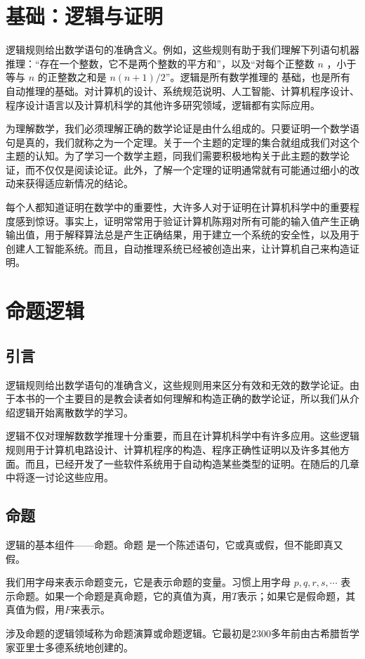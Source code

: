 \section{基础：逻辑与证明}
逻辑规则给出数学语句的准确含义。例如，这些规则有助于我们理解下列语句机器推理：“存在一个整数，它不是两个整数的平方和”，以及“对每个正整数 $n$ ，小于等与 $n$ 的正整数之和是 $n(n+1)/2$”。逻辑是所有数学推理的 基础，也是所有自动推理的基础。对计算机的设计、系统规范说明、人工智能、计算机程序设计、程序设计语言以及计算机科学的其他许多研究领域，逻辑都有实际应用。

为理解数学，我们必须理解正确的数学论证是由什么组成的。只要证明一个数学语句是真的，我们就称之为一个定理。关于一个主题的定理的集合就组成我们对这个主题的认知。为了学习一个数学主题，同我们需要积极地构关于此主题的数学论证，而不仅仅是阅读论证。此外，了解一个定理的证明通常就有可能通过细小的改动来获得适应新情况的结论。

每个人都知道证明在数学中的重要性，大许多人对于证明在计算机科学中的重要程度感到惊讶。事实上，证明常常用于验证计算机陈翔对所有可能的输入值产生正确输出值，用于解释算法总是产生正确结果，用于建立一个系统的安全性，以及用于创建人工智能系统。而且，自动推理系统已经被创造出来，让计算机自己来构造证明。
\section{命题逻辑}
\subsection{引言}
逻辑规则给出数学语句的准确含义，这些规则用来区分有效和无效的数学论证。由于本书的一个主要目的是教会读者如何理解和构造正确的数学论证，所以我们从介绍逻辑开始离散数学的学习。  

逻辑不仅对理解数数学推理十分重要，而且在计算机科学中有许多应用。这些逻辑规则用于计算机电路设计、计算机程序的构造、程序正确性证明以及许多其他方面。而且，已经开发了一些软件系统用于自动构造某些类型的证明。在随后的几章中将逐一讨论这些应用。

\subsection{命题}
逻辑的基本组件——命题。命题 是一个陈述语句，它或真或假，但不能即真又假。  

我们用字母来表示命题变元，它是表示命题的变量。习惯上用字母 
$p,q,r,s,\cdots$ 
表示命题。如果一个命题是真命题，它的真值为真，用$T$表示；如果它是假命题，其真值为假，用$F$来表示。  

涉及命题的逻辑领域称为命题演算或命题逻辑。它最初是2300多年前由古希腊哲学家亚里士多德系统地创建的。  

